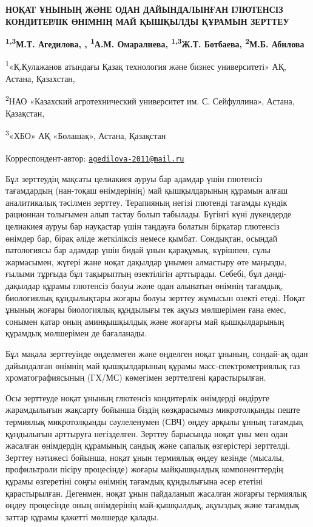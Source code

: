 
{\bfseries НОҚАТ ҰНЫНЫҢ ЖӘНЕ ОДАН ДАЙЫНДАЛЫНҒАН ГЛЮТЕНСІЗ КОНДИТЕРЛІК
ӨНІМНІҢ МАЙ ҚЫШҚЫЛДЫ ҚҰРАМЫН ЗЕРТТЕУ}

{\bfseries \textsuperscript{1,3}М.Т. Агедилова\textsuperscript{\envelope }, ,
\textsuperscript{1}А.М. Омаралиева, \textsuperscript{1,3}Ж.Т. Ботбаева,
\textsuperscript{2}М.Б. Абилова}

\textsuperscript{1}«Қ.Қулажанов атындағы Қазақ технология және бизнес
университеті» АҚ, Астана, Қазахстан,

\textsuperscript{2}НАО «Казахский агротехнический университет им. С.
Сейфуллина», Астана, Қазақстан,

\textsuperscript{3}«ХБО» АҚ «Болашақ», Астана, Қазақстан


{\bfseries \textsuperscript{\envelope }}Корреспондент-автор:
\href{mailto:agedilova-2011@mail.ru}{\nolinkurl{agedilova-2011@mail.ru}}

Бұл зерттеудің мақсаты целиакиея ауруы бар адамдар үшін глютенсіз
тағамдардың (нан-тоқаш өнімдерінің) май қышқылдарының құрамын алғаш
аналитикалық тәсілмен зерттеу. Терапияның негізі глютенді тағамды күндік
рационнан толығымен алып тастау болып табылады. Бүгінгі күні дүкендерде
целиакиея ауруы бар науқастар үшін таңдауға болатын бірқатар глютенсіз
өнімдер бар, бірақ әліде жеткіліксіз немесе қымбат. Сондықтан, осындай
патологиясы бар адамдар үшін бидай ұнын қарақұмық, күрішпен, сұлы
жармасымен, жүгері жане ноқат дақылдар ұнымен алмастыру өте маңызды,
ғылыми тұрғыда бұл тақырыптың өзектілігін арттырады. Себебі, бұл дәнді-
дақылдар құрамы глютенсіз болуы және одан алынатын өнімнің тағамдық,
биологиялық құндылықтары жоғары болуы зерттеу жұмысын өзекті етеді.
Ноқат ұнының жоғары биологиялық құндылығы тек ақуыз мөлшерімен ғана
емес, сонымен қатар оның аминқышқылдық және жоғарғы май қышқылдарының
құрамдық мөлшерімен де бағаланады.

Бұл мақала зерттеуінде өңделмеген және өңделген ноқат ұнының, сондай-ақ
одан дайындалған өнімнің май қышқылдарының құрамы масс-спектрометриялық
газ хроматографиясының (ГХ/МС) көмегімен зерттелгені қарастырылған.

Осы зерттеуде ноқат ұнының глютенсіз кондитерлік өнімдерді өндіруге
жарамдылығын жақсарту бойынша біздің көзқарасымыз микротолқынды пеште
термиялық микротолқынды сәулеленумен (СВЧ) өңдеу арқылы ұнның тағамдық
құндылығын арттыруға негізделген. Зерттеу барысында ноқат ұны мен одан
жасалған өнімдердің құрамының сандық және сапалық өзгерістері зерттелді.
Зерттеу нәтижесі бойынша, ноқат ұнын термиялық өңдеу кезінде (мысалы,
профильтроли пісіру процесінде) жоғары майқышқылдық компоненттердің
құрамы өзгеретіні соңғы өнімнің тағамдық құндылығына әсер ететіні
қарастырылған. Дегенмен, ноқат ұнын пайдаланып жасалған жоғарғы
термиялық өңдеу процесінде оның өнімдерінің май-қышқылдық, ақуыздық және
тағамдық заттар құрамы қажетті мөлшерде қалады.

